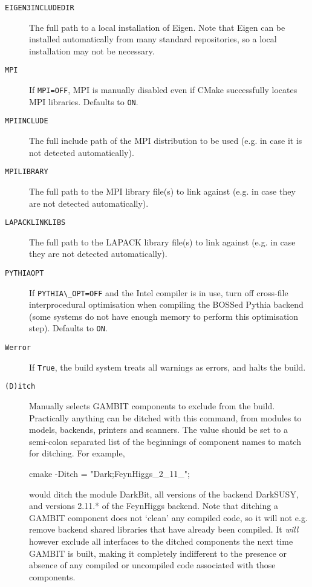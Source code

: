 \documentclass[pdftex,twocolumn,epjc3_preprint,runningheads]{svjour3}
\renewcommand{\_}{\discretionary{\underscore}{}{\underscore}}
\newcommand\term[1]{{\lstset{style=terminal}\lstinline!#1!\lstset{style=cpp}}}
\newcommand{\gambit}{\textsf{GAMBIT}\xspace}
\newcommand{\darkbit}{\textsf{DarkBit}\xspace}
\newcommand{\GB}{\gambit}
\newcommand{\mpi}{\textsf{MPI}\xspace}
\begin{document}
\begin{description}
  \item[\tt{EIGEN3\_INCLUDE\_DIR}] The full path to a local installation of \textsf{Eigen}.  Note that \textsf{Eigen} can be installed automatically from many standard repositories, so a local installation may not be necessary.
  \item[\tt{MPI}] If \term{MPI=OFF}, \mpi is manually disabled even if \textsf{CMake} successfully locates \mpi libraries.  Defaults to \term{ON}.
	\item[\tt{MPI\_INCLUDE}] The full include path of the \mpi distribution to be used (e.g. in case it is not detected automatically).
	\item[\tt{MPI\_LIBRARY}] The full path to the \mpi library file(s) to link against (e.g. in case they are not detected automatically).
	\item[\tt{LAPACK\_LINKLIBS}] The full path to the LAPACK library file(s) to link against (e.g. in case they are not detected automatically).
  \item[\tt{PYTHIA\_OPT}] If \term{PYTHIA\_OPT=OFF} and the Intel compiler is in use, turn off cross-file interprocedural optimisation when compiling the BOSSed \textsf{Pythia} backend (some systems do not have enough memory to perform this optimisation step).  Defaults to \term{ON}.
  \item[\tt{Werror}] If \term{True}, the build system treats all warnings as errors, and halts the build.
	\item[\tt{(D)itch}] Manually selects \GB components to exclude from the build.  Practically anything can be ditched with this command, from modules to models, backends, printers and scanners.  The value should be set to a semi-colon separated list of the beginnings of component names to match for ditching.  For example,
  \begin{lstterm}
cmake -Ditch = "Dark;FeynHiggs_2_11_";
  \end{lstterm}
  would ditch the module \darkbit, all versions of the backend \textsf{DarkSUSY}, and versions 2.11.* of the \textsf{FeynHiggs} backend.  Note that ditching a \GB component does not `clean' any compiled code, so it will not e.g. remove backend shared libraries that have already been compiled.  It \textit{will} however exclude all interfaces to the ditched components the next time \GB is built, making it completely indifferent to the presence or absence of any compiled or uncompiled code associated with those components.
\end{description}
\end{document}

